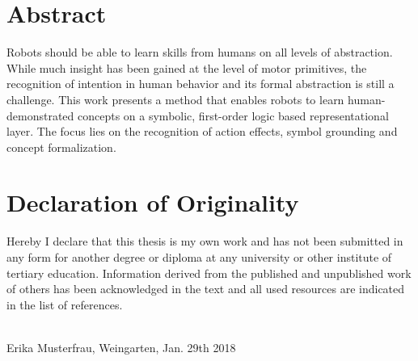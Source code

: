 \section*{Abstract}
Robots should be able to learn skills from humans on all levels of abstraction. While much insight has been gained at the level of motor primitives, the recognition of intention in human behavior and its formal abstraction is still a challenge. This work presents a method that enables robots to learn human-demonstrated concepts on a symbolic, first-order logic based representational layer. The focus lies on the recognition of action effects, symbol grounding and concept formalization.


\vspace*{13cm}

\section*{Declaration of Originality}
Hereby I declare that this thesis is my own work and has not been submitted in any form for another degree or diploma at any university or other institute of tertiary education. Information derived from the published and unpublished work of others has been acknowledged in the text and all used resources are indicated in the list of references.

\vspace{1cm}

\underline{\hspace{5cm}}\\

Erika Musterfrau, Weingarten, Jan. 29th 2018

